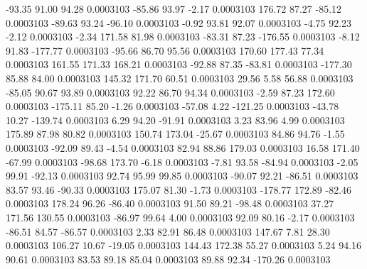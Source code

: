       -93.35       91.00       94.28     0.0003103
      -85.86       93.97       -2.17     0.0003103
      176.72       87.27      -85.12     0.0003103
      -89.63       93.24      -96.10     0.0003103
       -0.92       93.81       92.07     0.0003103
       -4.75       92.23       -2.12     0.0003103
       -2.34      171.58       81.98     0.0003103
      -83.31       87.23     -176.55     0.0003103
       -8.12       91.83     -177.77     0.0003103
      -95.66       86.70       95.56     0.0003103
      170.60      177.43       77.34     0.0003103
      161.55      171.33      168.21     0.0003103
      -92.88       87.35      -83.81     0.0003103
     -177.30       85.88       84.00     0.0003103
      145.32      171.70       60.51     0.0003103
       29.56        5.58       56.88     0.0003103
      -85.05       90.67       93.89     0.0003103
       92.22       86.70       94.34     0.0003103
       -2.59       87.23      172.60     0.0003103
     -175.11       85.20       -1.26     0.0003103
      -57.08        4.22     -121.25     0.0003103
      -43.78       10.27     -139.74     0.0003103
        6.29       94.20      -91.91     0.0003103
        3.23       83.96        4.99     0.0003103
      175.89       87.98       80.82     0.0003103
      150.74      173.04      -25.67     0.0003103
       84.86       94.76       -1.55     0.0003103
      -92.09       89.43       -4.54     0.0003103
       82.94       88.86      179.03     0.0003103
       16.58      171.40      -67.99     0.0003103
      -98.68      173.70       -6.18     0.0003103
       -7.81       93.58      -84.94     0.0003103
       -2.05       99.91      -92.13     0.0003103
       92.74       95.99       99.85     0.0003103
      -90.07       92.21      -86.51     0.0003103
       83.57       93.46      -90.33     0.0003103
      175.07       81.30       -1.73     0.0003103
     -178.77      172.89      -82.46     0.0003103
      178.24       96.26      -86.40     0.0003103
       91.50       89.21      -98.48     0.0003103
       37.27      171.56      130.55     0.0003103
      -86.97       99.64        4.00     0.0003103
       92.09       80.16       -2.17     0.0003103
      -86.51       84.57      -86.57     0.0003103
        2.33       82.91       86.48     0.0003103
      147.67        7.81       28.30     0.0003103
      106.27       10.67      -19.05     0.0003103
      144.43      172.38       55.27     0.0003103
        5.24       94.16       90.61     0.0003103
       83.53       89.18       85.04     0.0003103
       89.88       92.34     -170.26     0.0003103
